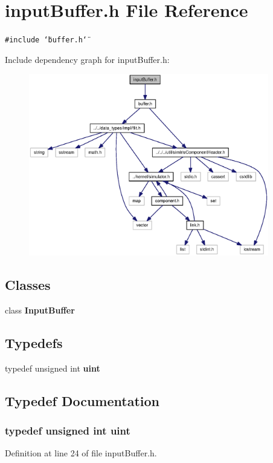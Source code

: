 \section{inputBuffer.h File Reference}
\label{inputBuffer_8h}
{\tt \#include \char`\"{}buffer.h\char`\"{}}\par


Include dependency graph for inputBuffer.h:\nopagebreak
\begin{figure}[H]
\begin{center}
\leavevmode
\includegraphics[width=297pt]{inputBuffer_8h__incl}
\end{center}
\end{figure}
\subsection*{Classes}
\begin{CompactItemize}
\item 
class {\bf InputBuffer}
\end{CompactItemize}
\subsection*{Typedefs}
\begin{CompactItemize}
\item 
typedef unsigned int {\bf uint}
\end{CompactItemize}


\subsection{Typedef Documentation}
\subsubsection[{uint}]{\setlength{\rightskip}{0pt plus 5cm}typedef unsigned int {\bf uint}}\label{inputBuffer_8h_91ad9478d81a7aaf2593e8d9c3d06a14}




Definition at line 24 of file inputBuffer.h.